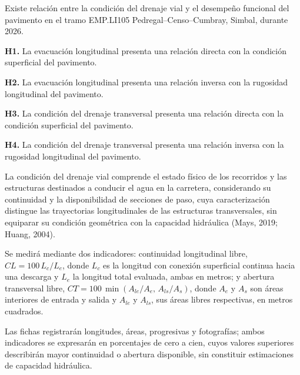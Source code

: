 

Existe relación entre la condición del drenaje vial y el desempeño funcional del pavimento en el tramo EMP.LI105 Pedregal–Censo–Cumbray, Simbal, durante 2026.


\begin{listaTesis}
\item \textbf{H1.} La evacuación longitudinal presenta una relación directa con la condición superficial del pavimento.
\item \textbf{H2.} La evacuación longitudinal presenta una relación inversa con la rugosidad longitudinal del pavimento.
\item \textbf{H3.} La condición del drenaje transversal presenta una relación directa con la condición superficial del pavimento.
\item \textbf{H4.} La condición del drenaje transversal presenta una relación inversa con la rugosidad longitudinal del pavimento.
\end{listaTesis}




La condición del drenaje vial comprende el estado físico de los recorridos y las estructuras destinados a conducir el agua en la carretera, considerando su continuidad y la disponibilidad de secciones de paso, cuya caracterización distingue las trayectorias longitudinales de las estructuras transversales, sin equiparar su condición geométrica con la capacidad hidráulica (Mays, 2019; Huang, 2004).


Se medirá mediante dos indicadores: continuidad longitudinal libre, \(CL=100\,L_c/L_e\), donde \(L_c\) es la longitud con conexión superficial continua hacia una descarga y \(L_e\) la longitud total evaluada, ambas en metros; y abertura transversal libre, \(CT=100\,\min(A_{le}/A_e,\,A_{ls}/A_s)\), donde \(A_e\) y \(A_s\) son áreas interiores de entrada y salida y \(A_{le}\) y \(A_{ls}\), sus áreas libres respectivas, en metros cuadrados.

Las fichas registrarán longitudes, áreas, progresivas y fotografías; ambos indicadores se expresarán en porcentajes de cero a cien, cuyos valores superiores describirán mayor continuidad o abertura disponible, sin constituir estimaciones de capacidad hidráulica.

